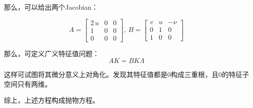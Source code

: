 \documentclass[UTF8,zihao=5]{ctexart} %
\begin{document}
那么，可以给出两个Jacobian：

$$
A=\left[\begin{array}{ccc} 2\,u & 0 & 0\\ 1 & 0 & 0\\ 0 & 0 & 0 \end{array}\right]
,\ 
B=\left[\begin{array}{ccc} v & u & -\nu \\ 0 & 1 & 0\\ 1 & 0 & 0 \end{array}\right]
$$

那么，可定义广义特征值问题：
$$
AK=BK\Lambda
$$

这样可试图将其微分意义上对角化。发现其特征值都是0构成三重根，且0的特征子空间只有两维。

综上，上述方程构成抛物方程。



































\end{document}
